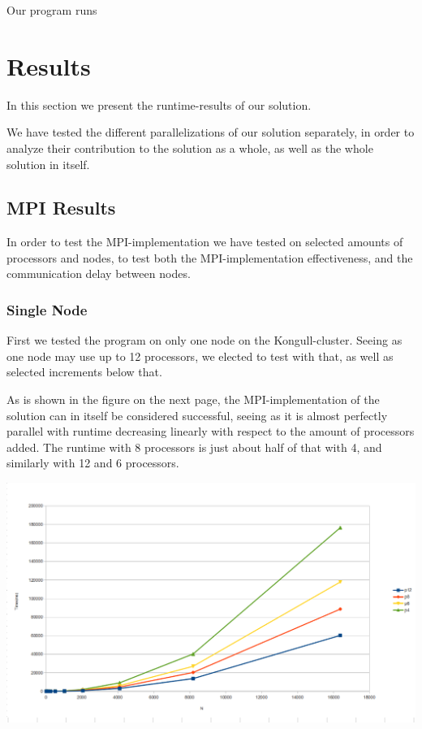 \documentclass[fontsize=11pt,paper=a4,titlepage]{article}
\begin{document}
Our program runs


\section{Results}

In this section we present the runtime-results of our solution.

We have tested the different parallelizations of our solution separately, in
order to analyze their contribution to the solution as a whole, as well as the
whole solution in itself.

\subsection{MPI Results}

In order to test the MPI-implementation we have tested on selected amounts of
processors and nodes, to test both the MPI-implementation effectiveness, and the
communication delay between nodes.

\subsubsection{Single Node}

First we tested the program on only one node on the Kongull-cluster. Seeing as
one node may use up to 12 processors, we elected to test with that, as well as
selected increments below that.

As is shown in the figure on the next page, the MPI-implementation of the
solution can in itself be considered successful, seeing as it is almost
perfectly parallel with runtime decreasing linearly with respect to the amount
of processors added. The runtime with 8 processors is just about half of that
with 4, and similarly with 12 and 6 processors.

\hspace*{-1.7cm}\includegraphics[scale=0.6]{pics/pX.png}
\end{document}
